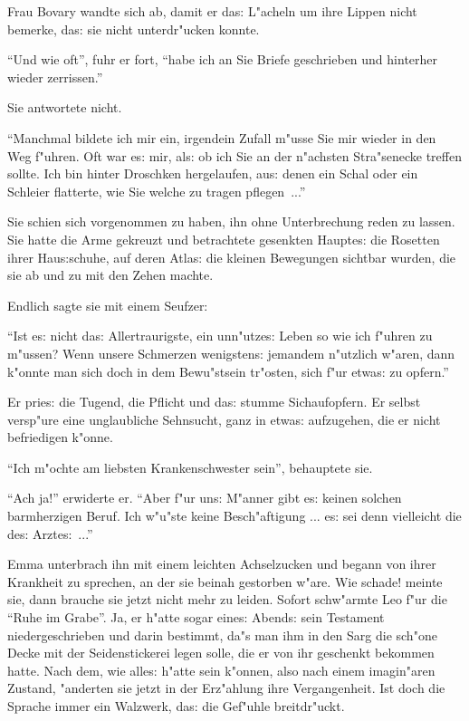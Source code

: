 \documentclass[oneside,12pt]{book}
\newcommand{\s}{s:}%
\begin{document}
Frau Bovary wandte sich ab, damit er da{\s} L"acheln um ihre
Lippen nicht bemerke, da{\s} sie nicht unterdr"ucken konnte.

"`Und wie oft"', fuhr er fort, "`habe ich an Sie Briefe
geschrieben und hinterher wieder zerrissen."'

Sie antwortete nicht.

"`Manchmal bildete ich mir ein, irgendein Zufall m"usse Sie mir
wieder in den Weg f"uhren. Oft war e{\s} mir, al{\s} ob ich Sie an
der n"achsten Stra"senecke treffen sollte. Ich bin hinter
Droschken hergelaufen, au{\s} denen ein Schal oder ein Schleier
flatterte, wie Sie welche zu tragen pflegen~..."'

Sie schien sich vorgenommen zu haben, ihn ohne Unterbrechung reden
zu lassen. Sie hatte die Arme gekreuzt und betrachtete gesenkten
Haupte{\s} die Rosetten ihrer Hau{\s}schuhe, auf deren Atla{\s}
die kleinen Bewegungen sichtbar wurden, die sie ab und zu mit den
Zehen machte.

Endlich sagte sie mit einem Seufzer:

"`Ist e{\s} nicht da{\s} Allertraurigste, ein unn"utze{\s} Leben
so wie ich f"uhren zu m"ussen? Wenn unsere Schmerzen wenigsten{\s}
jemandem n"utzlich w"aren, dann k"onnte man sich doch in dem
Bewu"stsein tr"osten, sich f"ur etwa{\s} zu opfern."'

Er prie{\s} die Tugend, die Pflicht und da{\s} stumme Sichaufopfern.
Er selbst versp"ure eine unglaubliche Sehnsucht, ganz in etwa{\s}
aufzugehen, die er nicht befriedigen k"onne.

"`Ich m"ochte am liebsten Krankenschwester sein"', behauptete sie.

"`Ach ja!"' erwiderte er. "`Aber f"ur un{\s} M"anner gibt e{\s}
keinen solchen barmherzigen Beruf. Ich w"u"ste keine Besch"aftigung
... e{\s} sei denn vielleicht die de{\s} Arzte{\s}~..."'

Emma unterbrach ihn mit einem leichten Achselzucken und begann von
ihrer Krankheit zu sprechen, an der sie beinah gestorben w"are.
Wie schade! meinte sie, dann brauche sie jetzt nicht mehr zu
leiden. Sofort schw"armte Leo f"ur die "`Ruhe im Grabe"'. Ja, er
h"atte sogar eine{\s} Abend{\s} sein Testament niedergeschrieben
und darin bestimmt, da"s man ihm in den Sarg die sch"one Decke mit
der Seidenstickerei legen solle, die er von ihr geschenkt bekommen
hatte. Nach dem, wie alle{\s} h"atte sein k"onnen, also nach einem
imagin"aren Zustand, "anderten sie jetzt in der Erz"ahlung ihre
Vergangenheit. Ist doch die Sprache immer ein Walzwerk, da{\s} die
Gef"uhle breitdr"uckt.
\end{document}
